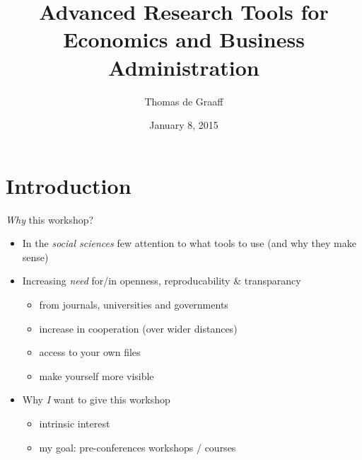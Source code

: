 \documentclass[ignorenonframetext,]{beamer}
\title{Advanced Research Tools for Economics and Business Administration}
\author{Thomas de Graaff}
\date{January 8, 2015}
\begin{document}
\frame{\titlepage}

\section{Introduction}\label{introduction}

\begin{frame}{\emph{Why} this workshop?}

\begin{itemize}
\item
  In the \emph{social sciences} few attention to what tools to use (and
  why they make sense)
\item
  Increasing \emph{need} for/in openness, reproducability \&
  transparancy

  \begin{itemize}
  \itemsep1pt\parskip0pt
  \item
    from journals, universities and governments
  \item
    increase in cooperation (over wider distances)
  \item
    access to your own files
  \item
    make yourself more visible
  \end{itemize}
\item
  Why \emph{I} want to give this workshop

  \begin{itemize}
  \itemsep1pt\parskip0pt
  \item
    intrinsic interest
  \item
    my goal: pre-conferences workshops / courses
  \end{itemize}
\end{itemize}

\end{frame}
\end{document}
